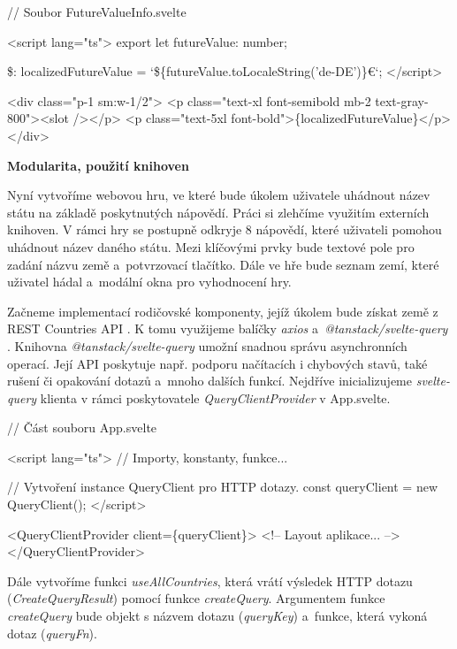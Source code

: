 \begin{prog}
// Soubor FutureValueInfo.svelte
  
<script lang="ts">
  export let futureValue: number;

  \$: localizedFutureValue = `\$\{futureValue.toLocaleString('de-DE')\}€`;
</script>

<div class="p-1 sm:w-1/2">
  <p class="text-xl font-semibold mb-2 text-gray-800"><slot /></p>
  <p class="text-5xl font-bold">\{localizedFutureValue\}</p>
</div>
\end{prog}

\begin{flushleft}
  \textbf{Modularita, použití knihoven}
\end{flushleft}

Nyní vytvoříme webovou hru, ve které bude úkolem uživatele uhádnout název státu na základě poskytnutých nápovědí. Práci si zlehčíme využitím externích knihoven. 
V rámci hry se postupně odkryje 8 nápovědí, které uživateli pomohou uhádnout název daného státu. Mezi klíčovými prvky bude textové pole pro zadání názvu země a~potvrzovací tlačítko. 
Dále ve hře bude seznam zemí, které uživatel hádal a~modální okna pro vyhodnocení hry.

Začneme implementací rodičovské komponenty, jejíž úkolem bude získat země z REST Countries API \cite{restcountriesapi}. 
K tomu využijeme balíčky \emph{axios} \cite{axioslib} a~\emph{@tanstack/svelte-query} \cite{tanstackquerylib}. 
Knihovna \emph{@tanstack/svelte-query} umožní snadnou správu asynchronních operací. Její API poskytuje např. podporu načítacích i chybových stavů, také rušení či opakování dotazů a~mnoho dalších funkcí. 
Nejdříve inicializujeme \emph{svelte-query} klienta v rámci poskytovatele \emph{QueryClientProvider} v App.svelte.

\begin{prog}
// Část souboru App.svelte

<script lang="ts">
  // Importy, konstanty, funkce...  

  // Vytvoření instance QueryClient pro HTTP dotazy.
  const queryClient = new QueryClient();
</script>

<QueryClientProvider client=\{queryClient\}>
  <!-- Layout aplikace... -->
</QueryClientProvider>
\end{prog}

Dále vytvoříme funkci \emph{useAllCountries}, která vrátí výsledek HTTP dotazu (\emph{CreateQueryResult}) pomocí funkce \emph{createQuery}. 
Argumentem funkce \emph{createQuery} bude objekt s názvem dotazu (\emph{queryKey}) a~funkce, která vykoná dotaz (\emph{queryFn}).

